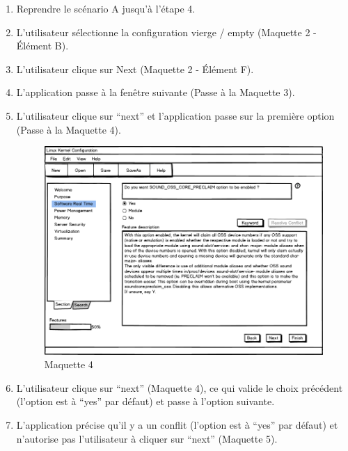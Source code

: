 \documentclass[16pts]{report}
\begin{document}
\begin{enumerate}
    \item Reprendre le scénario A jusqu’à l’étape 4.
    \item L’utilisateur sélectionne la configuration vierge / empty  (Maquette
        2 - Élément B).
    \item L’utilisateur clique sur Next (Maquette 2 - Élément F).
    \item L’application passe à la fenêtre suivante (Passe à la Maquette 3).
    \item L’utilisateur clique sur “next” et l’application passe sur la
        première option (Passe à la Maquette 4).
    \begin{figure}[H]
        \includegraphics[scale=0.5]{illustrations/maquettes/Maquette_4_MainWindowSection.png}
        \centering
        \caption{Maquette 4}
        \label{fig:Maq4}
    \end{figure}
    \item L’utilisateur clique sur “next” (Maquette 4), ce qui valide le choix
        précédent (l’option est à “yes” par défaut) et passe à l’option suivante.
    \item L’application précise qu’il y a un conflit (l’option est à “yes” par
        défaut) et n’autorise pas l'utilisateur à cliquer sur “next” (Maquette 5).
    \begin{figure}[H]

\end{figure}
\end{enumerate}
\end{document}
